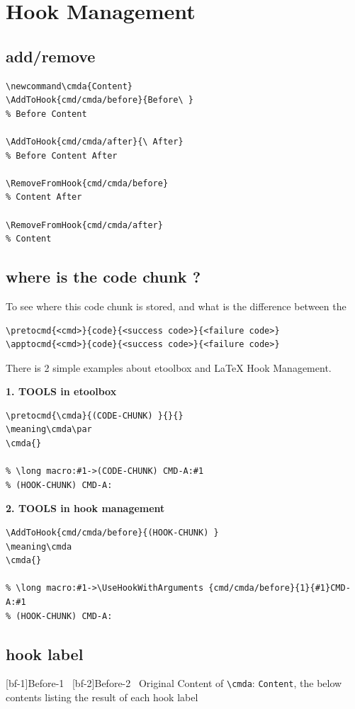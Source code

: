 \documentclass{article}
\newcommand\tbh{\textbackslash}
\newcommand\cmda{Content}
\begin{document}
\tableofcontents
\newpage

\section{Hook Management}
\subsection{add/remove}
\begin{lstlisting}
\newcommand\cmda{Content}
\AddToHook{cmd/cmda/before}{Before\ }
% Before Content

\AddToHook{cmd/cmda/after}{\ After}
% Before Content After

\RemoveFromHook{cmd/cmda/before}
% Content After

\RemoveFromHook{cmd/cmda/after}
% Content
\end{lstlisting}

\subsection{where is the code chunk ?}
To see where this code chunk is stored, and what is the difference
between the
\begin{lstlisting}
\pretocmd{<cmd>}{code}{<success code>}{<failure code>}
\apptocmd{<cmd>}{code}{<success code>}{<failure code>}
\end{lstlisting}

There is 2 simple examples about etoolbox and \LaTeX{} Hook Management.

\textbf{1. TOOLS in etoolbox}
\begin{lstlisting}
\pretocmd{\cmda}{(CODE-CHUNK) }{}{}
\meaning\cmda\par
\cmda{}

% \long macro:#1->(CODE-CHUNK) CMD-A:#1
% (HOOK-CHUNK) CMD-A:
\end{lstlisting}

\textbf{2. TOOLS in hook management}
\begin{lstlisting}
\AddToHook{cmd/cmda/before}{(HOOK-CHUNK) }
\meaning\cmda
\cmda{}

% \long macro:#1->\UseHookWithArguments {cmd/cmda/before}{1}{#1}CMD-A:#1
% (HOOK-CHUNK) CMD-A:
\end{lstlisting}

\subsection{hook label}
[bf-1]{Before-1\ }
[bf-2]{Before-2\ }
\quad Original Content of \texttt{\tbh cmda}: \texttt{\cmda}, the below contents listing the result of each hook label\par
\end{document}
